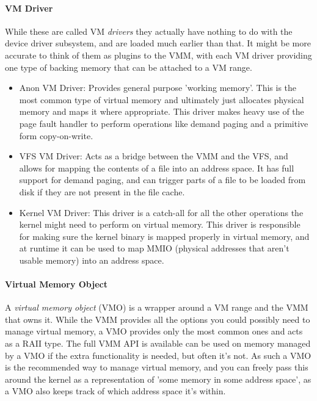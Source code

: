 \paragraph{VM Driver} 
\label{vmdrivers}
While these are called VM \textit{drivers} they actually have nothing to do with the device driver subsystem, and are loaded much earlier than that. It might be more accurate to think of them as plugins to the VMM, with each VM driver providing one type of backing memory that can be attached to a VM range.

\begin{itemize}
    \item Anon VM Driver: Provides general purpose 'working memory'. This is the most common type of virtual memory and ultimately just allocates physical memory and maps it where appropriate. This driver makes heavy use of the page fault handler to perform operations like demand paging and a primitive form copy-on-write.
    \item VFS VM Driver: Acts as a bridge between the VMM and the VFS, and allows for mapping the contents of a file into an address space. It has full support for demand paging, and can trigger parts of a file to be loaded from disk if they are not present in the file cache.
    \item Kernel VM Driver: This driver is a catch-all for all the other operations the kernel might need to perform on virtual memory. This driver is responsible for making sure the kernel binary is mapped properly in virtual memory, and at runtime it can be used to map MMIO (physical addresses that aren't usable memory) into an address space.
\end{itemize}

\paragraph{Virtual Memory Object}
A \textit{virtual memory object} (VMO) is a wrapper around a VM range and the VMM that owns it. While the VMM provides all the options you could possibly need to manage virtual memory, a VMO provides only the most common ones and acts as a RAII type. The full VMM API is available can be used on memory managed by a VMO if the extra functionality is needed, but often it's not. As such a VMO is the recommended way to manage virtual memory, and you can freely pass this around the kernel as a representation of 'some memory in some address space', as a VMO also keeps track of which address space it's within.

